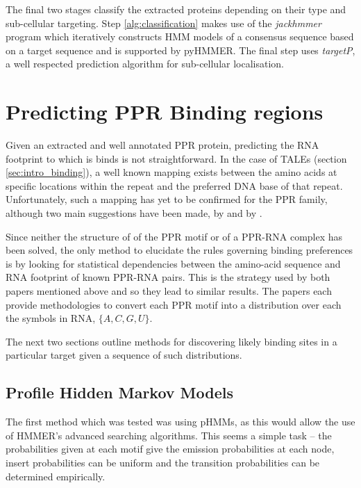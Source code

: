 The final two stages classify the extracted proteins depending on their type
and sub-cellular targeting.
Step \ref{alg:classification} makes use of the \emph{jackhmmer} program which
iteratively constructs HMM models of a consensus sequence based on a target
sequence and is supported by pyHMMER.
The final step uses \emph{targetP}, a well respected prediction algorithm for
sub-cellular localisation\citep{targetP}.

\section{Predicting PPR Binding regions}
\label{sec:ppr_binding_prediction}

Given an extracted and well annotated PPR protein, predicting the RNA footprint
to which is binds is not straightforward.
In the case of TALEs (section \ref{sec:intro_binding}), a well known mapping
exists between the amino acids at specific locations within the repeat and the
preferred DNA base of that repeat.
Unfortunately, such a mapping has yet to be confirmed for the PPR family,
although two main suggestions have been made, by \citet{Barkan2012} and by
\citet{Yagi2013}.

Since neither the structure of of the PPR motif or of a PPR-RNA complex
has been solved, the only method to elucidate the rules governing binding
preferences is by looking for statistical dependencies between the amino-acid
sequence and RNA footprint of known PPR-RNA pairs.
This is the strategy used by both papers mentioned above and so they lead to
similar results.
The papers each provide methodologies to convert each PPR motif into a
distribution over each the symbols in RNA, $\{A,C,G,U\}$.

The next two sections outline methods for discovering likely binding sites
in a particular target given a sequence of such distributions.

\subsection{Profile Hidden Markov Models}
\label{sec:hmm_binding}

The first method which was tested was using pHMMs, as this would allow the use
of HMMER's advanced searching algorithms.
This seems a simple task -- the probabilities given at each motif give the
emission probabilities at each node, insert probabilities can be uniform and
the transition probabilities can be determined empirically.

